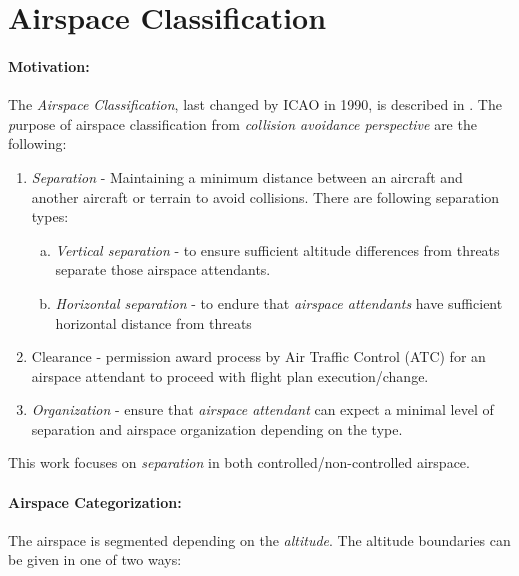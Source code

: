 
\section{Airspace Classification}\label{sec:AirspaceClassification}
\paragraph{Motivation:} The \emph{Airspace Classification}, last changed by ICAO in 1990, is described in \cite{icaoAnnex11}. The \emph purpose of airspace classification from \emph{collision avoidance perspective} are the following:

\begin{enumerate}
    \item \emph{Separation} - Maintaining a minimum distance between an aircraft and another aircraft or terrain to avoid collisions. There are following separation types:
    \begin{enumerate}[a.]
        \item \emph{Vertical separation} - to ensure sufficient altitude differences from threats separate those airspace attendants.
        
        \item \emph{Horizontal  separation} - to endure that \emph{airspace attendants} have sufficient horizontal distance from threats
    \end{enumerate}
    
    \item{Clearance} - permission award process by Air Traffic Control (ATC) for an airspace attendant to proceed with flight plan execution/change.
    
    \item \emph{Organization} - ensure that \emph{airspace attendant} can expect a minimal level of separation and airspace organization depending on the type.
\end{enumerate}

\begin{note}
    This work focuses on \emph{separation} in both controlled/non-controlled airspace.
\end{note}

\paragraph{Airspace Categorization:} The airspace is segmented depending on the \emph{altitude}. The altitude boundaries can be given in one of two ways:

